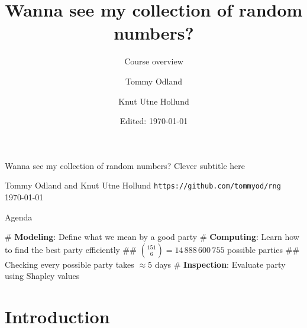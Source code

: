 \documentclass[12pt, aspectratio=149]{beamer}
\institute{Equinor}
\date{Edited: \today}
\author{Tommy Odland \and Knut Utne Hollund}
\title{Wanna see my collection of random numbers?}
\subtitle{Course overview}
\theoremstyle{plain}
\begin{document}
\begin{frame}{}
	\begin{center}
			\vfill
	{\huge Wanna see my collection of random numbers?}
	\vfill
	{\large Clever subtitle here}
	\vfill
	

	\vfill
	{\large  Tommy Odland and Knut Utne Hollund}
	\vfill
	{\small \texttt{https://github.com/tommyod/rng}}
	\vfill
	\today
	\vfill
	\end{center}
\end{frame}


\begin{frame}[fragile]{Agenda}
	\begin{center}
	\end{center}
	
	\begin{easylist}[itemize]
		# \textbf{Modeling}: Define what we mean by a good party
		# \textbf{Computing}: Learn how to find the best party efficiently
		## $\binom{151}{6} = 14\,888\,600\,755$ possible parties
		## Checking every possible party takes $\approx 5$ days
		# \textbf{Inspection}: Evaluate party using Shapley values
	\end{easylist}
\end{frame}

\section{Introduction}
\end{document}
